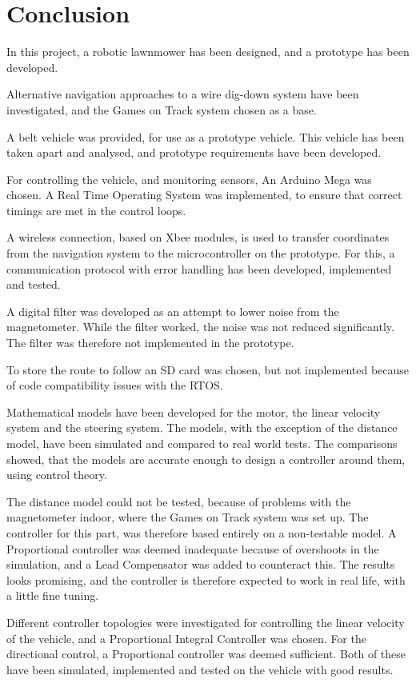 \chapter{Conclusion}\label{cha:conclusion}
In this project, a robotic lawnmower has been designed, and a prototype has been developed.

Alternative navigation approaches to a wire dig-down system have been investigated, and the Games on Track system chosen as a base. 

A belt vehicle was provided, for use as a prototype vehicle. This vehicle has been taken apart and analysed, and prototype requirements have been developed.

For controlling the vehicle, and monitoring sensors, An Arduino Mega was chosen. A Real Time Operating System was implemented, to ensure that correct timings are met in the control loops.  

A wireless connection, based on Xbee modules, is used to transfer coordinates from the navigation system to the microcontroller on the prototype. For this, a communication protocol with error handling has been developed, implemented and tested.

A digital filter was developed as an attempt to lower noise from the magnetometer. While the filter worked, the noise was not reduced significantly. The filter was therefore not implemented in the prototype.

To store the route to follow an SD card was chosen, but not implemented because of code compatibility issues with the RTOS.

Mathematical models have been developed for the motor, the linear velocity system and the steering system. The models, with the exception of the distance model, have been simulated and compared to real world tests. The comparisons showed, that the models are accurate enough to design a controller around them, using control theory.

The distance model could not be tested, because of problems with the magnetometer indoor, where the Games on Track system was set up. The controller for this part, was therefore based entirely on a non-testable model. A Proportional controller was deemed inadequate because of overshoots in the simulation, and a Lead Compensator was added to counteract this. The results looks promising, and the controller is therefore expected to work in real life, with a little fine tuning.
	
Different controller topologies were investigated for controlling the linear velocity of the vehicle, and a Proportional Integral Controller was chosen. For the directional control, a Proportional controller was deemed sufficient. Both of these have been simulated, implemented and tested on the vehicle with good results.
